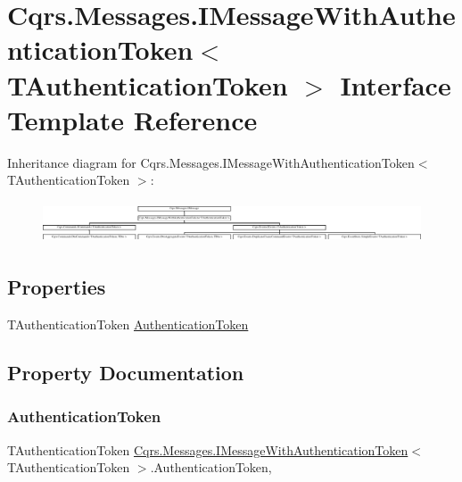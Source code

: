 \hypertarget{interfaceCqrs_1_1Messages_1_1IMessageWithAuthenticationToken}{}\section{Cqrs.\+Messages.\+I\+Message\+With\+Authentication\+Token$<$ T\+Authentication\+Token $>$ Interface Template Reference}
\label{interfaceCqrs_1_1Messages_1_1IMessageWithAuthenticationToken}
Inheritance diagram for Cqrs.\+Messages.\+I\+Message\+With\+Authentication\+Token$<$ T\+Authentication\+Token $>$\+:\begin{figure}[H]
\begin{center}
\leavevmode
\includegraphics[height=1.250000cm]{interfaceCqrs_1_1Messages_1_1IMessageWithAuthenticationToken}
\end{center}
\end{figure}
\subsection*{Properties}
\begin{DoxyCompactItemize}
\item 
T\+Authentication\+Token \hyperlink{interfaceCqrs_1_1Messages_1_1IMessageWithAuthenticationToken_ac80645a12251d6d8766b0ee18e0386f1}{Authentication\+Token}
\end{DoxyCompactItemize}


\subsection{Property Documentation}
\mbox{\label{interfaceCqrs_1_1Messages_1_1IMessageWithAuthenticationToken_ac80645a12251d6d8766b0ee18e0386f1}} 
\subsubsection{\texorpdfstring{Authentication\+Token}{AuthenticationToken}}
{\footnotesize\ttfamily T\+Authentication\+Token \hyperlink{interfaceCqrs_1_1Messages_1_1IMessageWithAuthenticationToken}{Cqrs.\+Messages.\+I\+Message\+With\+Authentication\+Token}$<$ T\+Authentication\+Token $>$.Authentication\+Token\hspace{0.3cm}{\ttfamily [get]}, {\ttfamily [set]}}

